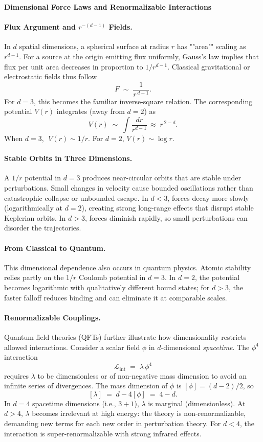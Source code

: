 \begin{technical}
    {\Large \textbf{Dimensional Force Laws and Renormalizable Interactions}}
    
    \paragraph{Flux Argument and $r^{-(d-1)}$ Fields.}
    In $d$ spatial dimensions, a spherical surface at radius $r$ has ""area"" scaling as $r^{d-1}$. For a source at the origin emitting flux uniformly, Gauss's law implies that flux per unit area decreases in proportion to $1/r^{d-1}$. Classical gravitational or electrostatic fields thus follow 
    $$
    F \;\sim\; \frac{1}{r^{\,d-1}}.
    $$
    For $d=3$, this becomes the familiar inverse-square relation. The corresponding potential $V(r)$ integrates (away from $d=2$) as
    $$
    V(r) \;\sim\; \int \frac{dr}{r^{d-1}} \,\approx\; r^{\,2-d}.
    $$
    When $d=3$, $\;V(r)\sim 1/r$. For $d=2$, $V(r)\sim \log r$.
    
    \paragraph{Stable Orbits in Three Dimensions.}
    A $1/r$ potential in $d=3$ produces near-circular orbits that are stable under perturbations. Small changes in velocity cause bounded oscillations rather than catastrophic collapse or unbounded escape. In $d<3$, forces decay more slowly (logarithmically at $d=2$), creating strong long-range effects that disrupt stable Keplerian orbits. In $d>3$, forces diminish rapidly, so small perturbations can disorder the trajectories.
    
    \paragraph{From Classical to Quantum.}
    This dimensional dependence also occurs in quantum physics. Atomic stability relies partly on the $1/r$ Coulomb potential in $d=3$. In $d=2$, the potential becomes logarithmic with qualitatively different bound states; for $d>3$, the faster falloff reduces binding and can eliminate it at comparable scales.
    
    \paragraph{Renormalizable Couplings.}
    Quantum field theories (QFTs) further illustrate how dimensionality restricts allowed interactions. Consider a scalar field $\phi$ in $d$-dimensional \emph{spacetime}. The $\phi^4$ interaction 
    $$
    \mathcal{L}_{\mathrm{int}} \;=\; \lambda\,\phi^4
    $$
    requires $\lambda$ to be dimensionless or of non-negative mass dimension to avoid an infinite series of divergences. The mass dimension of $\phi$ is $[\phi] = (d - 2)/2$, so
    $$
    [\lambda] \;=\; d - 4[\phi] \;=\; 4 - d.
    $$
    In $d=4$ spacetime dimensions (i.e., $3+1$), $\lambda$ is marginal (dimensionless). At $d>4$, $\lambda$ becomes irrelevant at high energy: the theory is non-renormalizable, demanding new terms for each new order in perturbation theory. For $d<4$, the interaction is super-renormalizable with strong infrared effects.
    

\end{technical}
